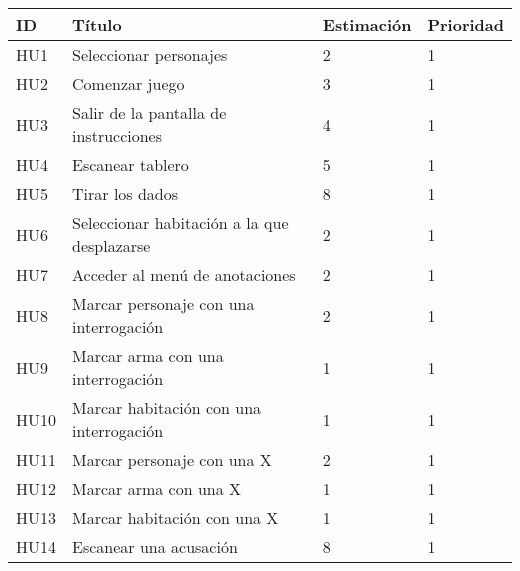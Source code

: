 \begin{table}[h]
  \begin{center}
    \begin{tabular}{|p{1cm}|p{7.5cm}|p{1.9cm}|p{1.6cm}|}

      \hline
        \rowcolor{Gray} \textbf{ID}
        & \textbf{Título}
        & \textbf{Estimación}
        & \textbf{Prioridad}\\

      \hline
      HU1
      & Seleccionar personajes
      & 2
      & 1\\

      \hline
      HU2
      & Comenzar juego
      & 3
      & 1\\

      \hline
      HU3
      & Salir de la pantalla de instrucciones
      & 4
      & 1\\

      \hline
      HU4
      & Escanear tablero
      & 5
      & 1\\

      \hline
      HU5
      & Tirar los dados
      & 8
      & 1\\

      \hline
      HU6
      & Seleccionar habitación a la que desplazarse
      & 2
      & 1\\

      \hline
      HU7
      & Acceder al menú de anotaciones
      & 2
      & 1\\

      \hline
      HU8
      & Marcar personaje con una interrogación
      & 2
      & 1\\

      \hline
      HU9
      & Marcar arma con una interrogación
      & 1
      & 1\\

      \hline
      HU10
      & Marcar habitación con una interrogación
      & 1
      & 1\\

      \hline
      HU11
      & Marcar personaje con una X
      & 2
      & 1\\

      \hline
      HU12
      & Marcar arma con una X
      & 1
      & 1\\

      \hline
      HU13
      & Marcar habitación con una X
      & 1
      & 1\\

      \hline
      HU14
      & Escanear una acusación
      & 8
      & 1\\


\end{tabular}
\end{center}
\end{table}
